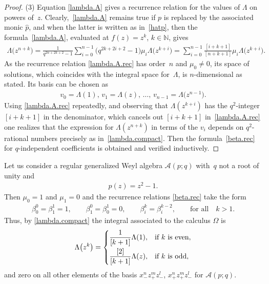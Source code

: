 \documentclass[10pt,a4paper]{amsart}
\numberwithin{equation}{section}
\def\AWeyl#1#2{{\mathcal{A}}(#1;#2)}
\begin{document}
\begin{proof}
(3) Equation \eqref{lambda.A} gives a recurrence relation for the values of $\Lambda$ on powers of~$z$. Clearly,~\eqref{lambda.A} remains true if $p$ is replaced by the associated monic $\hat{p}$, and when the latter is written as in~\eqref{hatp}, then
the formula~\eqref{lambda.A}, evaluated at $f(z)= z^k$, $k\in {\mathbb N}$, gives
\begin{gather}
\Lambda\big(z^{n+k}\big) = \frac{1}{q^{2n +2k +2} -1}\sum_{i=0}^{n-1}\big(q^{2k +2i +2} -1\big) \mu_i\Lambda\big(z^{k+i}\big)
 = \sum_{i=0}^{n-1} \frac{[i+k+1]}{[n+k+1]}\mu_i \Lambda\big(z^{k+i}\big).\label{lambda.A.rec}
\end{gather}
As the recurrence relation \eqref{lambda.A.rec} has order~$n$ and $\mu_0\neq 0$, its space of solutions, which coincides with the integral space for~$\Lambda$, is $n$-dimensional as stated. Its basis can be chosen as
\begin{gather*}
v_0 = \Lambda(1),\, v_1 = \Lambda(z), \,\ldots ,\, v_{n-1} = \Lambda\big(z^{n-1}\big).
\end{gather*}
Using \eqref{lambda.A.rec} repeatedly, and observing that $\Lambda(z^{k+i})$ has the $q^2$-integer $[i+k+1]$ in the de\-no\-mi\-nator, which cancels out $[i+k+1]$ in~\eqref{lambda.A.rec} one realizes that the expression for $\Lambda(z^{n+k})$ in terms of the $v_i$ depends on $q^2$-rational numbers precisely as in~\eqref{lambda.compact}. Then the formula~\eqref{beta.rec} for $q$-independent coef\/f\/icients is obtained and verif\/ied inductively.
\end{proof}

\begin{Example}\label{ex.lambda}
Let us consider a regular generalized Weyl algebra $\AWeyl p q$ with~$q$ not a root of unity and
\begin{gather*}
p(z) = z^2 -1.
\end{gather*}
Then $\mu_0 = 1$ and $\mu_1 = 0$ and the recurrence relations \eqref{beta.rec} take the form
\begin{gather*}
\beta^0_0 = \beta^1_1 = 1, \qquad \beta^0_1 = \beta^1_0 = 0, \qquad \beta^k_i = \beta^{k-2}_i, \qquad \mbox{for all} \quad k>1.
\end{gather*}
Thus, by \eqref{lambda.compact} the integral associated to the calculus $\Omega$ is
\begin{gather*}
\Lambda \big(z^k\big) =
\begin{cases} \dfrac{1}{[k +1]} \Lambda (1), & \mbox{if $k$ is even},\vspace{1mm}\\
\dfrac{[2]}{[k +1]} \Lambda (z), & \mbox{if $k$ is odd},
\end{cases}
\end{gather*}
and zero on all other elements of the basis $x_-^nz_+^mz_-^l$, $x_+^nz_+^mz_-^l$ for $\AWeyl p q$.
\end{Example}
\end{document}
